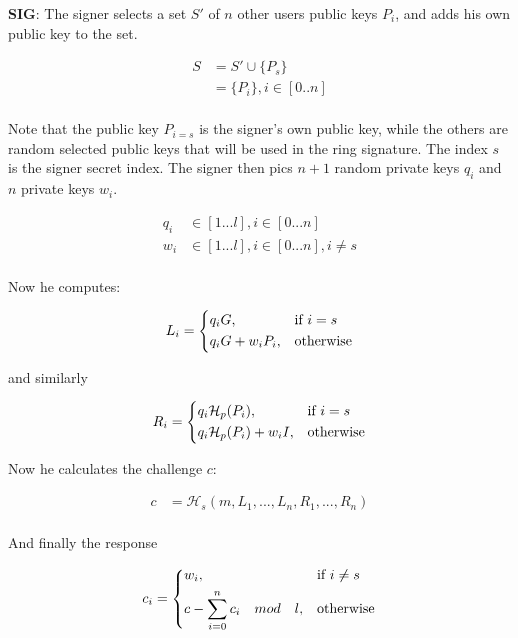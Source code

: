 \textbf{SIG}: 
The signer selects a set $S'$ of $n$ other users public keys $P_i$, and 
adds his own public key to the set. 

\begin{equation}
\begin{split}
S &= S' \cup \{P_s\}\\
 &= \{P_i\}, i \in [0..n] \\
\end{split}
\end{equation}

Note that the public key $P_{i=s}$ is the signer's own public key, while 
the others are random selected public keys that will be used in the ring 
signature. The index $s$ is the signer secret index. The signer then pics 
$n+1$ random private keys $q_i$ and $n$ private keys $w_i$.

\begin{equation}
\begin{split}
q_i &\in [1...l],  i \in [0...n] \\
w_i &\in [1...l],  i \in [0...n], i \not= s \\
\end{split}
\end{equation}

Now he computes:

\[
L_i= 
\begin{dcases}
q_iG,& \text{if } i = s\\
q_iG+w_iP_i,              & \text{otherwise}
\end{dcases}
\]

and similarly

\[
R_i= 
\begin{dcases}
q_i\mathcal{H}_p(P_i),& \text{if } i = s\\
q_i\mathcal{H}_p(P_i)+w_iI,              & \text{otherwise}
\end{dcases}
\]

Now he calculates the challenge $c$:

\begin{equation}
\begin{split}
c &= \mathcal{H}_s(m, L_1, ..., L_n, R_1, ..., R_n)\\
\end{split}
\end{equation}

And finally the response 

\[
c_i= 
\begin{dcases}
w_i,& \text{if } i \not= s\\
c-\sum_{i=0}^n c_i \quad mod\quad l,              & \text{otherwise}
\end{dcases}
\]

